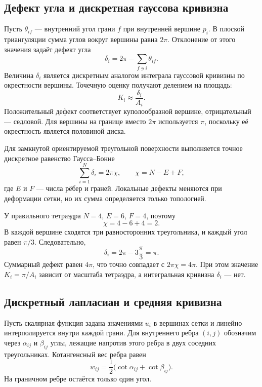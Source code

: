 \subsection{Дефект угла и дискретная гауссова кривизна}

Пусть \(\theta_{if}\) --- внутренний угол грани \(f\) при внутренней вершине \(p_i\). В плоской триангуляции сумма углов вокруг вершины равна \(2\pi\). Отклонение от этого значения задаёт дефект угла
\begin{equation}
\label{eq:angle-defect}
\boxed{
\delta_i
=2\pi-\sum_{f\ni i}\theta_{if}.
}
\end{equation}
Величина \(\delta_i\) является дискретным аналогом интеграла гауссовой кривизны по окрестности вершины. Точечную оценку получают делением на площадь:
\begin{equation}
\label{eq:discrete-gaussian-curvature}
K_i\approx\frac{\delta_i}{A_i}.
\end{equation}
Положительный дефект соответствует куполообразной вершине, отрицательный --- седловой. Для вершины на границе вместо \(2\pi\) используется \(\pi\), поскольку её окрестность является половиной диска.

Для замкнутой ориентируемой треугольной поверхности выполняется точное дискретное равенство Гаусса--Бонне
\begin{equation}
\label{eq:discrete-gauss-bonnet}
\boxed{
\sum_{i=1}^N\delta_i
=2\pi\chi,
\qquad
\chi=N-E+F,
}
\end{equation}
где \(E\) и \(F\) --- числа рёбер и граней. Локальные дефекты меняются при деформации сетки, но их сумма определяется только топологией.

\begin{example}
У правильного тетраэдра \(N=4\), \(E=6\), \(F=4\), поэтому
\[
\chi=4-6+4=2.
\]
В каждой вершине сходятся три равносторонних треугольника, и каждый угол равен \(\pi/3\). Следовательно,
\[
\delta_i
=2\pi-3\frac{\pi}{3}
=\pi.
\]
Суммарный дефект равен \(4\pi\), что точно совпадает с \(2\pi\chi=4\pi\). При этом значение \(K_i=\pi/A_i\) зависит от масштаба тетраэдра, а интегральная кривизна \(\delta_i\) --- нет.
\end{example}

\subsection{Дискретный лапласиан и средняя кривизна}

Пусть скалярная функция задана значениями \(u_i\) в вершинах сетки и линейно интерполируется внутри каждой грани. Для внутреннего ребра \((i,j)\) обозначим через \(\alpha_{ij}\) и \(\beta_{ij}\) углы, лежащие напротив этого ребра в двух соседних треугольниках. Котангенсный вес ребра равен
\begin{equation}
\label{eq:cotangent-weight}
w_{ij}
=\frac12\bigl(\cot\alpha_{ij}+\cot\beta_{ij}\bigr).
\end{equation}
На граничном ребре остаётся только один угол.


